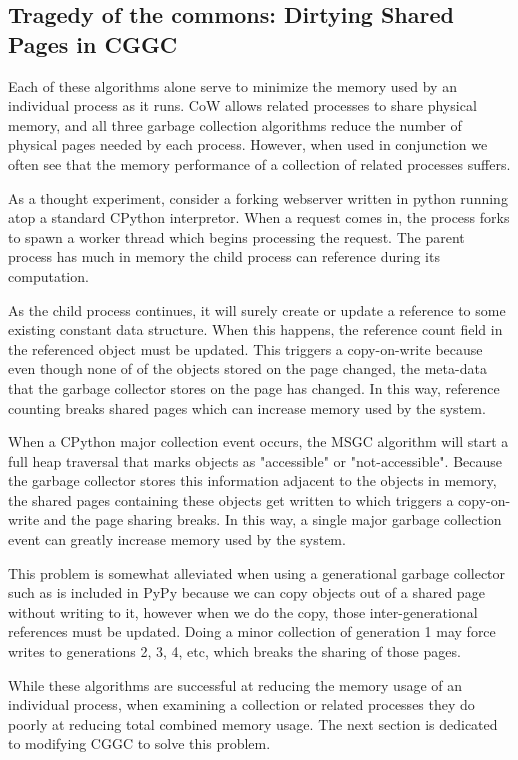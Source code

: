 \documentclass{article}
\begin{document}
\subsection{Tragedy of the commons: Dirtying Shared Pages in CGGC}\label{sec:CoWGC}

Each of these algorithms alone serve to minimize the memory used by an individual process as it runs.  CoW allows related processes to share physical memory, and all three garbage collection algorithms reduce the number of physical pages needed by each process.  However, when used in conjunction we often see that the memory performance of a collection of related processes suffers.

As a thought experiment, consider a forking webserver written in python running atop a standard CPython interpretor.  When a request comes in, the process forks to spawn a worker thread which begins processing the request.  The parent process has much in memory the child process can reference during its computation.  

As the child process continues, it will surely create or update a reference to some existing constant data structure.  When this happens, the reference count field in the referenced object must be updated.  This triggers a copy-on-write because even though none of of the objects stored on the page changed, the meta-data that the garbage collector stores on the page has changed.  In this way, reference counting breaks shared pages which can increase memory used by the system.

When a CPython major collection event occurs, the MSGC algorithm will start a full heap traversal that marks objects as "accessible" or "not-accessible".  Because the garbage collector stores this information adjacent to the objects in memory, the shared pages containing these objects get written to which triggers a copy-on-write and the page sharing breaks.  In this way, a single major garbage collection event can greatly increase memory used by the system.

This problem is somewhat alleviated when using a generational garbage collector such as is included in PyPy because we can copy objects out of a shared page without writing to it, however when we do the copy, those inter-generational references must be updated.  Doing a minor collection of generation 1 may force writes to generations 2, 3, 4, etc, which breaks the sharing of those pages.  

While these algorithms are successful at reducing the memory usage of an individual process, when examining a collection or related processes they do poorly at reducing total combined memory usage.  The next section is dedicated to modifying CGGC to solve this problem.  
\end{document}
